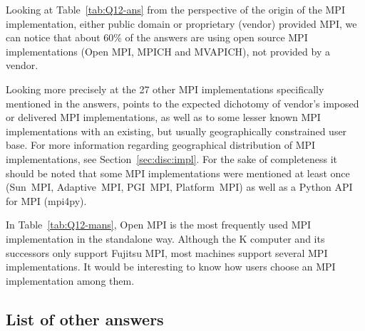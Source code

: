 Looking at Table~\ref{tab:Q12-ans} from the perspective of the origin of the MPI
implementation, either public domain or proprietary (vendor) provided MPI, we can
notice that about 60\% of the answers are using open source MPI
implementations (Open MPI, MPICH and MVAPICH), not provided by a
vendor.

Looking more precisely at the 27 other MPI implementations specifically
mentioned in the answers, points to the expected dichotomy of vendor's imposed
or delivered MPI implementations, as well as to some lesser known MPI
implementations with an existing, but usually geographically constrained user
base. For more information regarding geographical distribution of MPI
implementations, see Section~\ref{sec:disc:impl}.
For the sake of completeness it should be noted that some MPI implementations
were mentioned at least once (Sun~MPI, Adaptive~MPI, PGI~MPI, Platform~MPI) as
well as a Python API for MPI (mpi4py).



In Table~\ref{tab:Q12-mans}, Open MPI is the most frequently used MPI
implementation in the standalone way.  Although the K computer and its
successors only support Fujitsu MPI, most machines support several
MPI implementations. It would be interesting to know how users choose
an MPI implementation among them.



\subsection{List of other answers}

\begin{report}
\begin{itemize}

\end{itemize}
\end{report}
